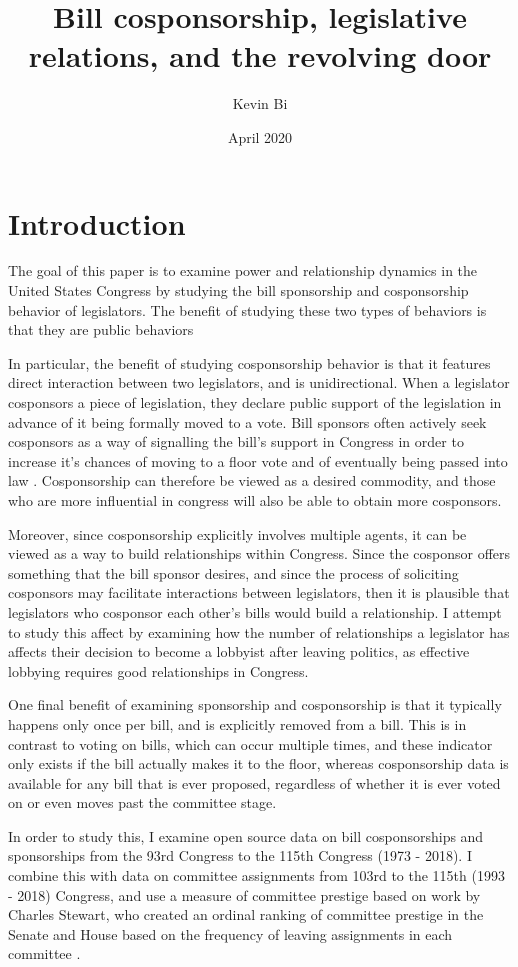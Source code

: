 \documentclass{article}
\title{Bill cosponsorship, legislative relations, and the revolving door}
\author{Kevin Bi}
\date{April 2020}
\begin{document}
\maketitle

\section{Introduction}
The goal of this paper is to examine power and relationship dynamics in the United States Congress by studying the bill sponsorship and cosponsorship behavior of legislators. The benefit of studying these two types of behaviors is that they are public behaviors 


In particular, the benefit of studying cosponsorship behavior is that it features direct interaction between two legislators, and is unidirectional. When a legislator cosponsors a piece of legislation, they declare public support of the legislation in advance of it being formally moved to a vote. Bill sponsors often actively seek cosponsors as a way of signalling the bill's support in Congress in order to increase it's chances of moving to a floor vote and of eventually being passed into law \cite{crs_sponsorship}. Cosponsorship can therefore be viewed as a desired commodity, and those who are more influential in congress will also be able to obtain more cosponsors. 

Moreover, since cosponsorship explicitly involves multiple agents, it can be viewed as a way to build relationships within Congress. Since the cosponsor offers something that the bill sponsor desires, and since the process of soliciting cosponsors may facilitate interactions between legislators, then it is plausible that legislators who cosponsor each other's bills would build a relationship. I attempt to study this affect by examining how the number of relationships a legislator has affects their decision to become a lobbyist after leaving politics, as effective lobbying requires good relationships in Congress. 

One final benefit of examining sponsorship and cosponsorship is that it typically happens only once per bill, and is explicitly removed from a bill. This is in contrast to voting on bills, which can occur multiple times, and these indicator only exists if the bill actually makes it to the floor, whereas cosponsorship data is available for any bill that is ever proposed, regardless of whether it is ever voted on or even moves past the committee stage. 

In order to study this, I examine open source data on bill cosponsorships and sponsorships from the 93rd Congress to the 115th Congress (1973 - 2018). I combine this with data on committee assignments from 103rd to the 115th (1993 - 2018) Congress, and use a measure of committee prestige based on work by Charles Stewart, who created an ordinal ranking of committee prestige in the Senate and House based on the frequency of leaving assignments in each committee \cite{stewart-committee-values}.
\end{document}
